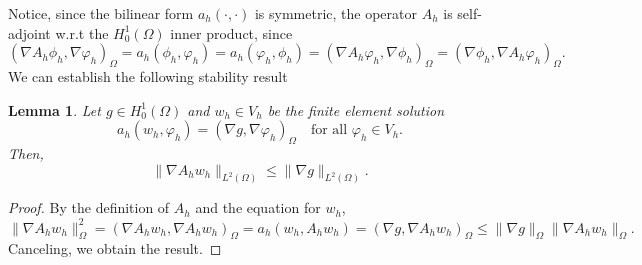 \documentclass{m2an}
\newcommand{\1}{\mathds{1}}
\newcommand{\Om}{\Omega}
\renewcommand{\textforall}{\text{for all }}
\newcommand{\na}{\nabla}
\newtheorem{lemma}[theorem]{Lemma}
\theoremstyle{definition}
\begin{document}
Notice, since the bilinear form $a_h(\cdot,\cdot)$ is symmetric, the operator $A_h$ is self-adjoint 
w.r.t the $H^1_0(\Om)$ inner product, since
$$
(\na A_h \phi_h,\na\varphi_h)_\Om=a_h(\phi_h,\varphi_h)=a_h(\varphi_h,\phi_h)=(\na A_h \varphi_h,\na\phi_h)_\Om=(\na\phi_h,\na A_h \varphi_h)_\Om.
$$
We can establish the following stability result
\begin{lemma}\label{lemma: elliptic na Ah}
Let $g\in H^1_0(\Om)$ and $w_h\in V_h$ be the finite element solution
$$
a_h(w_h,\varphi_h)=(\na g,\na\varphi_h)_\Om\quad \textforall\varphi_h\in V_h.
$$  
Then,
$$
\|\na A_h w_h\|_{L^2(\Om)}\le \|\na g\|_{L^2(\Om)}.
$$
\end{lemma}
\begin{proof}
By the definition of $A_h$ and the equation for $w_h$,
$$
\|\na A_h w_h\|_{\Om}^2=(\na A_h w_h, \na A_h w_h)_\Omega=a_h( w_h, A_h w_h)=(\na g,\na A_h w_h)_\Om\le \|\na g\|_{\Om}\|\na A_h w_h\|_{\Om}.
$$
Canceling, we obtain the result.
\end{proof}
\end{document}
